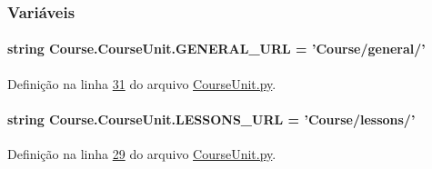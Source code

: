 \subsubsection{Variáveis}
\hypertarget{namespaceCourse_1_1CourseUnit_a3cd710129a2643083c77f1999a514340}{
\paragraph[{G\-E\-N\-E\-R\-A\-L\-\_\-\-U\-R\-L}]{\setlength{\rightskip}{0pt plus 5cm}string Course.\-Course\-Unit.\-G\-E\-N\-E\-R\-A\-L\-\_\-\-U\-R\-L = 'Course/general/'}}\label{namespaceCourse_1_1CourseUnit_a3cd710129a2643083c77f1999a514340}


Definição na linha \hyperlink{CourseUnit_8py_source_l00031}{31} do arquivo \hyperlink{CourseUnit_8py_source}{Course\-Unit.\-py}.

\hypertarget{namespaceCourse_1_1CourseUnit_a5ba3476c382ac640c10e98345fb14a85}{
\paragraph[{L\-E\-S\-S\-O\-N\-S\-\_\-\-U\-R\-L}]{\setlength{\rightskip}{0pt plus 5cm}string Course.\-Course\-Unit.\-L\-E\-S\-S\-O\-N\-S\-\_\-\-U\-R\-L = 'Course/lessons/'}}\label{namespaceCourse_1_1CourseUnit_a5ba3476c382ac640c10e98345fb14a85}


Definição na linha \hyperlink{CourseUnit_8py_source_l00029}{29} do arquivo \hyperlink{CourseUnit_8py_source}{Course\-Unit.\-py}.

